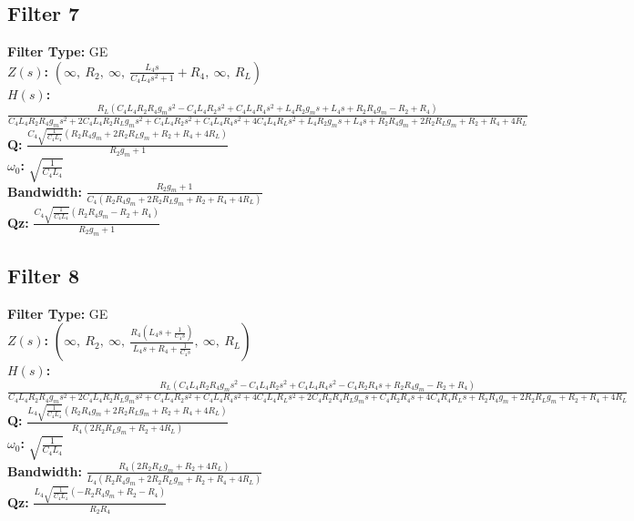 \documentclass{article}
\begin{document}
\subsection*{Filter 7}
\textbf{Filter Type:} GE \\ 
\textbf{$Z(s)$:} $\left( \infty, \  R_{2}, \  \infty, \  \frac{L_{4} s}{C_{4} L_{4} s^{2} + 1} + R_{4}, \  \infty, \  R_{L}\right)$ \\ 
\textbf{$H(s)$:} $\frac{R_{L} \left(C_{4} L_{4} R_{2} R_{4} g_{m} s^{2} - C_{4} L_{4} R_{2} s^{2} + C_{4} L_{4} R_{4} s^{2} + L_{4} R_{2} g_{m} s + L_{4} s + R_{2} R_{4} g_{m} - R_{2} + R_{4}\right)}{C_{4} L_{4} R_{2} R_{4} g_{m} s^{2} + 2 C_{4} L_{4} R_{2} R_{L} g_{m} s^{2} + C_{4} L_{4} R_{2} s^{2} + C_{4} L_{4} R_{4} s^{2} + 4 C_{4} L_{4} R_{L} s^{2} + L_{4} R_{2} g_{m} s + L_{4} s + R_{2} R_{4} g_{m} + 2 R_{2} R_{L} g_{m} + R_{2} + R_{4} + 4 R_{L}}$ \\ 
\textbf{Q:} $\frac{C_{4} \sqrt{\frac{1}{C_{4} L_{4}}} \left(R_{2} R_{4} g_{m} + 2 R_{2} R_{L} g_{m} + R_{2} + R_{4} + 4 R_{L}\right)}{R_{2} g_{m} + 1}$ \\ 
\textbf{$\omega_0$:} $\sqrt{\frac{1}{C_{4} L_{4}}}$ \\ 
\textbf{Bandwidth:} $\frac{R_{2} g_{m} + 1}{C_{4} \left(R_{2} R_{4} g_{m} + 2 R_{2} R_{L} g_{m} + R_{2} + R_{4} + 4 R_{L}\right)}$ \\ 
\textbf{Qz:} $\frac{C_{4} \sqrt{\frac{1}{C_{4} L_{4}}} \left(R_{2} R_{4} g_{m} - R_{2} + R_{4}\right)}{R_{2} g_{m} + 1}$ \\ 
\subsection*{Filter 8}
\textbf{Filter Type:} GE \\ 
\textbf{$Z(s)$:} $\left( \infty, \  R_{2}, \  \infty, \  \frac{R_{4} \left(L_{4} s + \frac{1}{C_{4} s}\right)}{L_{4} s + R_{4} + \frac{1}{C_{4} s}}, \  \infty, \  R_{L}\right)$ \\ 
\textbf{$H(s)$:} $\frac{R_{L} \left(C_{4} L_{4} R_{2} R_{4} g_{m} s^{2} - C_{4} L_{4} R_{2} s^{2} + C_{4} L_{4} R_{4} s^{2} - C_{4} R_{2} R_{4} s + R_{2} R_{4} g_{m} - R_{2} + R_{4}\right)}{C_{4} L_{4} R_{2} R_{4} g_{m} s^{2} + 2 C_{4} L_{4} R_{2} R_{L} g_{m} s^{2} + C_{4} L_{4} R_{2} s^{2} + C_{4} L_{4} R_{4} s^{2} + 4 C_{4} L_{4} R_{L} s^{2} + 2 C_{4} R_{2} R_{4} R_{L} g_{m} s + C_{4} R_{2} R_{4} s + 4 C_{4} R_{4} R_{L} s + R_{2} R_{4} g_{m} + 2 R_{2} R_{L} g_{m} + R_{2} + R_{4} + 4 R_{L}}$ \\ 
\textbf{Q:} $\frac{L_{4} \sqrt{\frac{1}{C_{4} L_{4}}} \left(R_{2} R_{4} g_{m} + 2 R_{2} R_{L} g_{m} + R_{2} + R_{4} + 4 R_{L}\right)}{R_{4} \left(2 R_{2} R_{L} g_{m} + R_{2} + 4 R_{L}\right)}$ \\ 
\textbf{$\omega_0$:} $\sqrt{\frac{1}{C_{4} L_{4}}}$ \\ 
\textbf{Bandwidth:} $\frac{R_{4} \left(2 R_{2} R_{L} g_{m} + R_{2} + 4 R_{L}\right)}{L_{4} \left(R_{2} R_{4} g_{m} + 2 R_{2} R_{L} g_{m} + R_{2} + R_{4} + 4 R_{L}\right)}$ \\ 
\textbf{Qz:} $\frac{L_{4} \sqrt{\frac{1}{C_{4} L_{4}}} \left(- R_{2} R_{4} g_{m} + R_{2} - R_{4}\right)}{R_{2} R_{4}}$ \\ 
\end{document}
